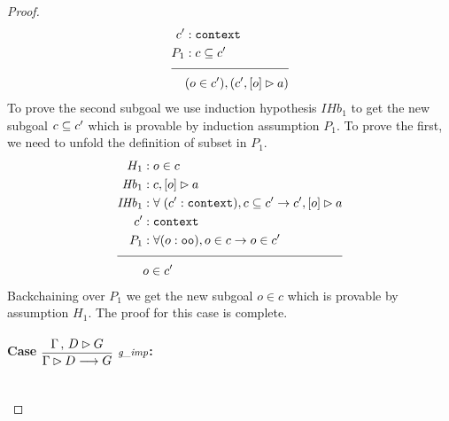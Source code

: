 \begin{proof}
\begin{align*}
\inddyncon{} &: \sltm{context} \\
P_1 &: c \subseteq \inddyncon{} \\[\pfshift{}]
\cline{1-2}
& (o \in \inddyncon{}), (\bchsl[\inddyncon{}]{o}{a})
\end{align*}
To prove the second subgoal we use induction hypothesis $\mathit{IHb}_1$ to get the new subgoal $c \subseteq c'{}$ which is provable by induction assumption $P_1$. To prove the first, we need to unfold the definition of subset in $P_1$.
\begin{align*}
H_1 &: o \in c \\
\mathit{Hb}_1 &: \bchsl[c]{o}{a} \\
\mathit{IHb}_1 &: \forall \; (\inddyncon{} : \sltm{context}), c \subseteq \inddyncon{} \rightarrow \bchsl[\inddyncon{}]{o}{a} \\
\inddyncon{} &: \sltm{context} \\
P_1 &: \forall (o : \sltm{oo}), o \in c \rightarrow o \in \inddyncon{} \\[\pfshift{}]
\cline{1-2}
& o \in \inddyncon{}
\end{align*}
Backchaining over $P_1$ we get the new subgoal $o \in c$ which is provable by assumption $H_1$. The proof for this case is complete.

\paragraph{Case $\vcenter{\rlsimp{}}$:} ~\\


\end{proof}
